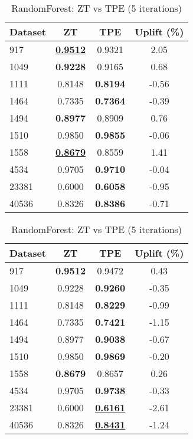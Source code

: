 \begin{table}[htbp]
\begin{center}
\begin{small}
\begin{sc}
\begin{subtable}[t]{0.48\textwidth}
    \centering
    \caption{RandomForest: ZT vs TPE (1 iteration)}
    \label{tab:randomforest-zt-vs-tpe-1}
    \begin{tabular}{lccc}
    \toprule
    \textbf{Dataset} & \textbf{ZT} & \textbf{TPE} & \textbf{Uplift (\%)} \\
    \midrule
    917    & \underline{\textbf{0.9512}} & 0.9321 & 2.05 \\
    1049    & \textbf{0.9228} & 0.9165 & 0.68 \\
    1111    & 0.8148 & \textbf{0.8194} & -0.56 \\
    1464    & 0.7335 & \textbf{0.7364} & -0.39 \\
    1494    & \textbf{0.8977} & 0.8909 & 0.76 \\
    1510    & 0.9850 & \textbf{0.9855} & -0.06 \\
    1558    & \underline{\textbf{0.8679}} & 0.8559 & 1.41 \\
    4534    & 0.9705 & \textbf{0.9710} & -0.04 \\
    23381    & 0.6000 & \textbf{0.6058} & -0.95 \\
    40536    & 0.8326 & \textbf{0.8386} & -0.71 \\
    \bottomrule
    \end{tabular}
\end{subtable}
\hfill
\begin{subtable}[t]{0.48\textwidth}
    \centering
    \caption{RandomForest: ZT vs TPE (5 iterations)}
    \label{tab:randomforest-zt-vs-tpe-5}
    \begin{tabular}{lccc}
    \toprule
    \textbf{Dataset} & \textbf{ZT} & \textbf{TPE} & \textbf{Uplift (\%)} \\
    \midrule
    917    & \textbf{0.9512} & 0.9472 & 0.43 \\
    1049    & 0.9228 & \textbf{0.9260} & -0.35 \\
    1111    & 0.8148 & \textbf{0.8229} & -0.99 \\
    1464    & 0.7335 & \textbf{0.7421} & -1.15 \\
    1494    & 0.8977 & \textbf{0.9038} & -0.67 \\
    1510    & 0.9850 & \textbf{0.9869} & -0.20 \\
    1558    & \textbf{0.8679} & 0.8657 & 0.26 \\
    4534    & 0.9705 & \textbf{0.9738} & -0.33 \\
    23381    & 0.6000 & \underline{\textbf{0.6161}} & -2.61 \\
    40536    & 0.8326 & \underline{\textbf{0.8431}} & -1.24 \\
    \bottomrule
    \end{tabular}
\end{subtable}


\end{sc}
\end{small}
\end{center}
\end{table}
